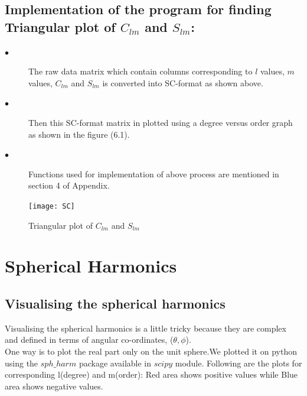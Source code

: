 \documentclass[a4paper,12pt]{report}
\begin{document}
\section{Implementation of the program for finding Triangular plot of $C_{lm}$ and $S_{lm}$:}
\begin{description}
\item[$\bullet$] The raw data matrix which contain columns corresponding to $l$ values, $m$ values, $C_{lm}$ and $S_{lm}$ is converted into SC-format as shown above.
\item[$\bullet$] Then this SC-format matrix in plotted using a degree versus order graph as shown in the figure (6.1).
\item[$\bullet$] Functions used for implementation of above process are mentioned in section 4 of Appendix.
\end{description}


\begin{figure}[!h]
	\centering
    \texttt{[image: SC]}
    \caption{Triangular plot of $C_{lm}$ and  $S_{lm}$}
    \newpage
\end{figure}

\newpage
\chapter{Spherical Harmonics}
\section{Visualising the spherical harmonics}
Visualising the spherical harmonics is a little tricky because they are complex and defined in terms of angular co-ordinates, ($\theta,\phi$).\\
One way is to plot the real part only on the unit sphere.We plotted it on
python using the $sph\_harm$ package available in $scipy$ module.
Following are the plots for corresponding l(degree) and m(order):
Red area shows positive values while Blue area shows negative values.
\end{document}
